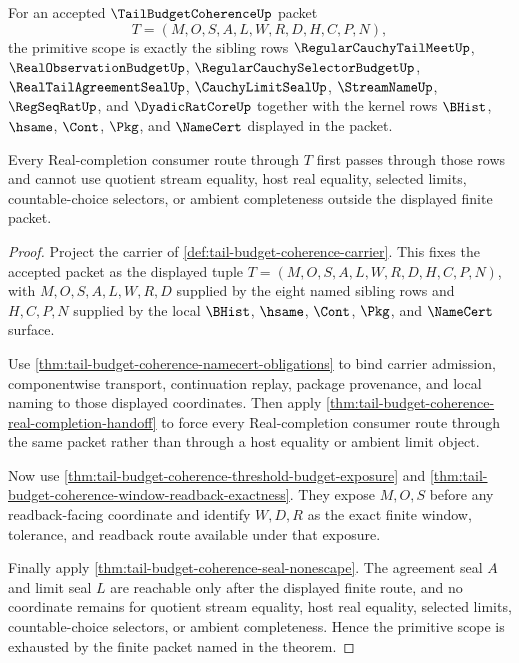 \begin{theorem}
\label{thm:tail-budget-coherence-primitive-scope}
For an accepted $\TailBudgetCoherenceUp$ packet
$$
T=(M,O,S,A,L,W,R,D,H,C,P,N),
$$
the primitive scope is exactly the sibling rows $\RegularCauchyTailMeetUp$, $\RealObservationBudgetUp$, $\RegularCauchySelectorBudgetUp$, $\RealTailAgreementSealUp$, $\CauchyLimitSealUp$, $\StreamNameUp$, $\RegSeqRatUp$, and $\DyadicRatCoreUp$ together with the kernel rows $\BHist$, $\hsame$, $\Cont$, $\Pkg$, and $\NameCert$ displayed in the packet.

Every Real-completion consumer route through $T$ first passes through those rows and cannot use quotient stream equality, host real equality, selected limits, countable-choice selectors, or ambient completeness outside the displayed finite packet.
\end{theorem}
\begin{proof}
Project the carrier of \autoref{def:tail-budget-coherence-carrier}. This fixes the accepted packet as the displayed tuple $T=(M,O,S,A,L,W,R,D,H,C,P,N)$, with $M,O,S,A,L,W,R,D$ supplied by the eight named sibling rows and $H,C,P,N$ supplied by the local $\BHist$, $\hsame$, $\Cont$, $\Pkg$, and $\NameCert$ surface.

Use \autoref{thm:tail-budget-coherence-namecert-obligations} to bind carrier admission, componentwise transport, continuation replay, package provenance, and local naming to those displayed coordinates. Then apply \autoref{thm:tail-budget-coherence-real-completion-handoff} to force every Real-completion consumer route through the same packet rather than through a host equality or ambient limit object.

Now use \autoref{thm:tail-budget-coherence-threshold-budget-exposure} and \autoref{thm:tail-budget-coherence-window-readback-exactness}. They expose $M,O,S$ before any readback-facing coordinate and identify $W,D,R$ as the exact finite window, tolerance, and readback route available under that exposure.

Finally apply \autoref{thm:tail-budget-coherence-seal-nonescape}. The agreement seal $A$ and limit seal $L$ are reachable only after the displayed finite route, and no coordinate remains for quotient stream equality, host real equality, selected limits, countable-choice selectors, or ambient completeness. Hence the primitive scope is exhausted by the finite packet named in the theorem.
\end{proof}

